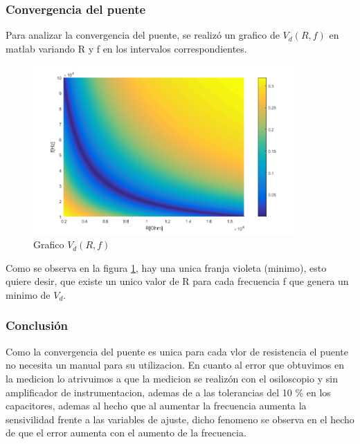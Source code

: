 \documentclass[../../main.tex]{subfiles}
\begin{document}
\subsubsection{Convergencia del puente}
Para analizar la convergencia del puente, se realizó un grafico de $V_d(R,f)$ en matlab variando R y f en los intervalos correspondientes.

\begin{figure}[H]	
	\centering
	\includegraphics[width=0.9\textwidth]{fotos/conv.png}
	\caption{Grafico $V_d(R,f)$}\label{fig:convw}
\end{figure}

Como se observa en la figura \ref{fig:convw}, hay una unica franja violeta (minimo), esto quiere desir, que existe un unico valor de R para cada frecuencia f que genera un minimo de $V_d$.

\subsubsection{Conclusión}
Como la convergencia del puente es unica para cada vlor de resistencia el puente no necesita un manual para su utilizacion. En cuanto al error que obtuvimos en la medicion lo atrivuimos a que la medicion se realizón con el osiloscopio y sin amplificador de instrumentacion, ademas de a las tolerancias del 10 \% en los capacitores, ademas al hecho que al aumentar la frecuencia aumenta la sensivilidad frente a las variables de ajuste, dicho fenomeno se observa en el hecho de que el error aumenta con el aumento de la frecuencia.
\end{document}

